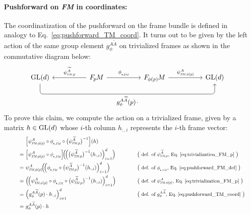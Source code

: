 \paragraph{Pushforward on \textit{FM} in coordinates:}
The coordinatization of the pushforward on the frame bundle is defined in analogy to Eq.~\eqref{eq:pushforward_TM_coord}.
It turns out to be given by the left action of the same group element $g_\phi^{A\widetilde{A}}$ on trivialized frames as shown in the commutative diagram below:
\begin{equation}\label{eq:pushforward_FM_coord}
    \begin{tikzcd}[row sep=4.em, column sep=5em]
        \GL{d}
            \arrow[rrr, pos=.5, rounded corners, to path={ 
                    -- ([yshift=-3.5ex]\tikztostart.south) 
                    --node[below]{\small$
                        g_\phi^{A\widetilde{A}}(p) \mkern2mu\cdot
                        $} ([yshift=-3.5ex]\tikztotarget.south) 
                    -- (\tikztotarget.south)
                    }]
        &
        \FpM
            \arrow[l, "\psiFMp^{\widetilde{A}}"']
            \arrow[r, "\dphiFM"]
        &
        \FphipM
            \arrow[r, "\psiFMphip^A"]
        &
        \GL{d}
    \end{tikzcd}
\end{equation}
To prove this claim, we compute the action on a trivialized frame, given by a matrix $h \in \operatorname{GL}(d)$ whose $i$-th column $h_{:,i}$ represents the $i$-th frame vector:
\begin{alignat}{3}
    \qquad\qquad
       & \Big[ \psiFMphip^A \circ \dphiFM \circ \big(\psiFMp^{\widetilde{A}}\big)^{-1} \Big](h) \notag \\
    =\ & \Big[ \psiFMphip^A \circ \dphiFM \Big] \!\Big( \!\Big( \big(\psiTMp^{\widetilde{A}}\big)^{-1} (h_{:,i})\Big)_{i=1}^d \Big)
        \qquad\quad && \big( \text{\small def. of $\psiFMp^{\widetilde{A}}$, Eq.~\eqref{eq:trivialization_FM_p} } \big) \notag \\
    =\ & \psiFMphip^A \!\Big( \!\Big( \dphiTM \circ \big(\psiTMp^{\widetilde{A}}\big)^{-1} (h_{:,i})\Big)_{i=1}^d \Big)
        \qquad\quad && \big( \text{\small def. of $\dphiFM$, Eq.~\eqref{eq:pushforward_FM_def} } \big) \notag \\
    =\ & \Big( \!\Big( \psiTMphip^A \circ \dphiTM \circ \big(\psiTMp^{\widetilde{A}}\big)^{-1} (h_{:,i})\Big)_{i=1}^d \Big)
        \qquad\quad && \big( \text{\small def. of $\psiFMphip^A$, Eq.~\eqref{eq:trivialization_FM_p} } \big) \notag \\
    =\ & \Big( g_\phi^{A\widetilde{A}}(p) \cdot h_{:,i} \Big)_{i=1}^d
        \qquad\quad && \big( \text{\small def. of $g_\phi^{A\widetilde{A}}$, Eq.~\eqref{eq:pushforward_TM_coord} } \big) \notag \\
    =\ & g_\phi^{A\widetilde{A}}(p) \cdot h
\end{alignat}



